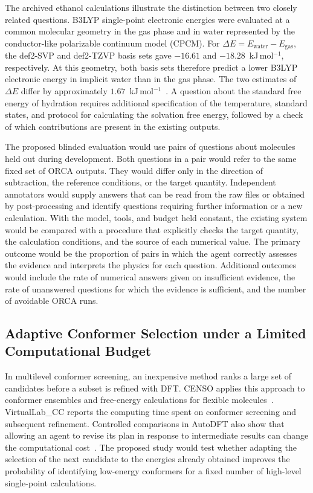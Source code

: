 \documentclass[a4paper,11pt]{article}
\begin{document}
The archived ethanol calculations illustrate the distinction between two
closely related questions.
B3LYP single-point electronic energies were evaluated at a common molecular
geometry in the gas phase and in water represented by the conductor-like
polarizable continuum model (CPCM).
For $\Delta E=E_{\mathrm{water}}-E_{\mathrm{gas}}$, the def2-SVP and
def2-TZVP basis sets gave $-16.61$ and $-18.28$~kJ\,mol$^{-1}$, respectively.
At this geometry, both basis sets therefore predict a lower B3LYP electronic
energy in implicit water than in the gas phase.
The two estimates of $\Delta E$ differ by approximately
$1.67$~kJ\,mol$^{-1}$~\cite{projectarchive}.
A question about the standard free energy of hydration requires additional
specification of the temperature, standard states, and protocol for calculating
the solvation free energy, followed by a check of which contributions are
present in the existing outputs.

The proposed blinded evaluation would use pairs of questions about molecules
held out during development.
Both questions in a pair would refer to the same fixed set of ORCA outputs.
They would differ only in the direction of subtraction, the reference
conditions, or the target quantity.
Independent annotators would supply answers that can be read from the raw files
or obtained by post-processing and identify questions requiring further
information or a new calculation.
With the model, tools, and budget held constant, the existing system would be
compared with a procedure that explicitly checks the target quantity, the
calculation conditions, and the source of each numerical value.
The primary outcome would be the proportion of pairs in which the agent
correctly assesses the evidence and interprets the physics for each question.
Additional outcomes would include the rate of numerical answers given on
insufficient evidence, the rate of unanswered questions for which the evidence
is sufficient, and the number of avoidable ORCA runs.

\subsection{Adaptive Conformer Selection under a Limited Computational Budget}

In multilevel conformer screening, an inexpensive method ranks a large set of
candidates before a subset is refined with DFT.
CENSO applies this approach to conformer ensembles and free-energy calculations
for flexible molecules~\cite{censo}.
VirtualLab\_CC reports the computing time spent on conformer screening and
subsequent refinement.
Controlled comparisons in AutoDFT also show that allowing an agent to revise
its plan in response to intermediate results can change the computational
cost~\cite{virtuallab,autodft}.
The proposed study would test whether adapting the selection of the next
candidate to the energies already obtained improves the probability of
identifying low-energy conformers for a fixed number of high-level
single-point calculations.
\end{document}
